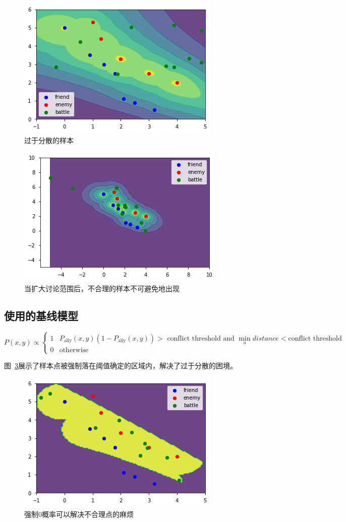 \documentclass{article}
\begin{document}
\begin{figure}[ht]
\includegraphics[width=0.6\linewidth]{comb2.png}
\caption{过于分散的样本}
\label{fig:combTwo}
\end{figure}

\begin{figure}[ht]
\includegraphics[width=0.6\linewidth]{comb4.png}
\caption{
当扩大讨论范围后，不合理的样本不可避免地出现}
\label{fig:combThree}
\end{figure}

\subsection{使用的基线模型}



$$
P(x,y) \propto
\begin{cases}
1 & P_\text{ally}(x,y) (1-P_\text{ally}(x,y)) > \text{ conflict threshold and }
    \min_{u} distance < \text{conflict threshold} \\
0 & \text{otherwise}
\end{cases}
$$


图~\ref{fig:combFive}展示了样本点被强制落在阈值确定的区域内，解决了过于分散的困境。

\begin{figure}[ht]
\includegraphics[width=0.6\linewidth]{comb5.png}
\caption{
强制0概率可以解决不合理点的麻烦}
\label{fig:combFive}
\end{figure}
\end{document}

